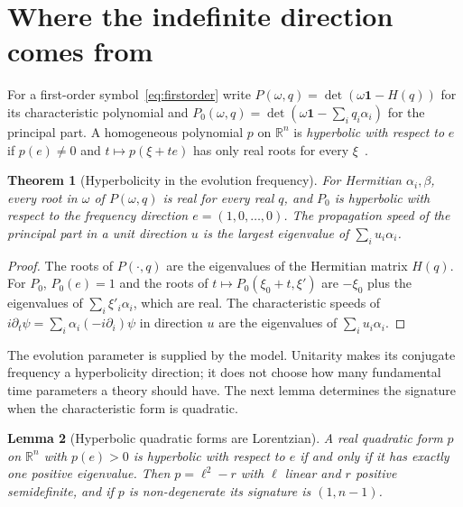 \documentclass[12pt]{article}
\newtheorem{theorem}{Theorem}
\newtheorem{lemma}[theorem]{Lemma}
\theoremstyle{definition}
\theoremstyle{remark}
\begin{document}
\section{Where the indefinite direction comes from}
\label{sec:indefinite}

For a first-order symbol~\eqref{eq:firstorder} write $P(\omega,q)=\det(\omega\mathbf 1-H(q))$ for its characteristic polynomial and $P_0(\omega,q)=\det(\omega\mathbf 1-\sum_iq_i\alpha_i)$ for the principal part. A homogeneous polynomial $p$ on $\mathbb R^n$ is \emph{hyperbolic with respect to} $e$ if $p(e)\neq0$ and $t\mapsto p(\xi+te)$ has only real roots for every $\xi$~\cite{Garding1959}.

\begin{theorem}[Hyperbolicity in the evolution frequency]
\label{thm:hyperbolic}
For Hermitian $\alpha_i,\beta$, every root in $\omega$ of $P(\omega,q)$ is real for every real $q$, and $P_0$ is hyperbolic with respect to the frequency direction $e=(1,0,\dots,0)$. The propagation speed of the principal part in a unit direction $u$ is the largest eigenvalue of $\sum_iu_i\alpha_i$.
\end{theorem}

\begin{proof}
The roots of $P(\cdot,q)$ are the eigenvalues of the Hermitian matrix $H(q)$. For $P_0$, $P_0(e)=1$ and the roots of $t\mapsto P_0(\xi_0+t,\xi')$ are $-\xi_0$ plus the eigenvalues of $\sum_i\xi'_i\alpha_i$, which are real. The characteristic speeds of $i\partial_t\psi=\sum_i\alpha_i(-i\partial_i)\psi$ in direction $u$ are the eigenvalues of $\sum_iu_i\alpha_i$.
\end{proof}

The evolution parameter is supplied by the model. Unitarity makes its conjugate frequency a hyperbolicity direction; it does not choose how many fundamental time parameters a theory should have. The next lemma determines the signature when the characteristic form is quadratic.

\begin{lemma}[Hyperbolic quadratic forms are Lorentzian]
\label{lem:hyperbolic-quadratic}
A real quadratic form $p$ on $\mathbb R^n$ with $p(e)>0$ is hyperbolic with respect to $e$ if and only if it has exactly one positive eigenvalue. Then $p=\ell^2-r$ with $\ell$ linear and $r$ positive semidefinite, and if $p$ is non-degenerate its signature is $(1,n-1)$.
\end{lemma}
\end{document}
